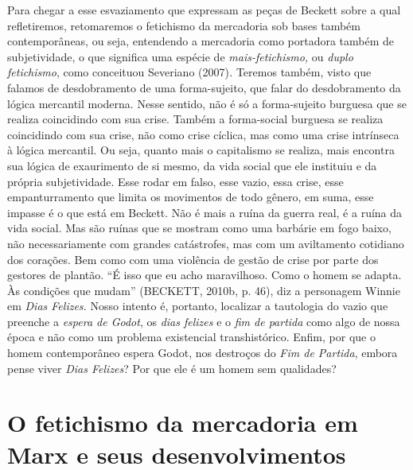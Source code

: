 Para chegar a esse esvaziamento que expressam as peças de Beckett sobre
a qual refletiremos, retomaremos o fetichismo da mercadoria sob bases
também contemporâneas, ou seja, entendendo a mercadoria como portadora
também de subjetividade, o que significa uma espécie de
\emph{mais-fetichismo,} ou \emph{duplo fetichismo}, como conceituou
Severiano (2007)\emph{.} Teremos também, visto que falamos de
desdobramento de uma forma-sujeito, que falar do desdobramento da lógica
mercantil moderna. Nesse sentido, não é só a forma-sujeito burguesa que
se realiza coincidindo com sua crise. Também a forma-social burguesa se
realiza coincidindo com sua crise, não como crise cíclica, mas como uma
crise intrínseca à lógica mercantil. Ou seja, quanto mais o capitalismo
se realiza, mais encontra sua lógica de exaurimento de si mesmo, da vida
social que ele instituiu e da própria subjetividade. Esse rodar em
falso, esse vazio, essa crise, esse empanturramento que limita os
movimentos de todo gênero, em suma, esse impasse é o que está em
Beckett. Não é mais a ruína da guerra real, é a ruína da vida social.
Mas são ruínas que se mostram como uma barbárie em fogo baixo, não
necessariamente com grandes catástrofes, mas com um aviltamento
cotidiano dos corações. Bem como com uma violência de gestão de crise
por parte dos gestores de plantão. ``É isso que eu acho maravilhoso.
Como o homem se adapta. Às condições que mudam'' (BECKETT, 2010b, p.
46), diz a personagem Winnie em \emph{Dias Felizes.} Nosso intento é,
portanto, localizar a tautologia do vazio que preenche a \emph{espera de
Godot}, os \emph{dias felizes} e o \emph{fim de partida} como algo de
nossa época e não como um problema existencial transhistórico. Enfim,
por que o homem contemporâneo espera Godot, nos destroços do \emph{Fim
de Partida}, embora pense viver \emph{Dias Felizes}? Por que ele é um
homem sem qualidades?

\section{O fetichismo da mercadoria em Marx e seus desenvolvimentos}

